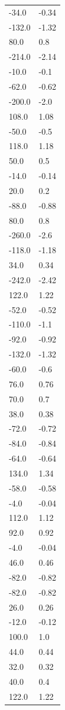 \begin{longtable}{ll}
-34.0 & -0.34 \\
-132.0 & -1.32 \\
80.0 & 0.8 \\
-214.0 & -2.14 \\
-10.0 & -0.1 \\
-62.0 & -0.62 \\
-200.0 & -2.0 \\
108.0 & 1.08 \\
-50.0 & -0.5 \\
118.0 & 1.18 \\
50.0 & 0.5 \\
-14.0 & -0.14 \\
20.0 & 0.2 \\
-88.0 & -0.88 \\
80.0 & 0.8 \\
-260.0 & -2.6 \\
-118.0 & -1.18 \\
34.0 & 0.34 \\
-242.0 & -2.42 \\
122.0 & 1.22 \\
-52.0 & -0.52 \\
-110.0 & -1.1 \\
-92.0 & -0.92 \\
-132.0 & -1.32 \\
-60.0 & -0.6 \\
76.0 & 0.76 \\
70.0 & 0.7 \\
38.0 & 0.38 \\
-72.0 & -0.72 \\
-84.0 & -0.84 \\
-64.0 & -0.64 \\
134.0 & 1.34 \\
-58.0 & -0.58 \\
-4.0 & -0.04 \\
112.0 & 1.12 \\
92.0 & 0.92 \\
-4.0 & -0.04 \\
46.0 & 0.46 \\
-82.0 & -0.82 \\
-82.0 & -0.82 \\
26.0 & 0.26 \\
-12.0 & -0.12 \\
100.0 & 1.0 \\
44.0 & 0.44 \\
32.0 & 0.32 \\
40.0 & 0.4 \\
122.0 & 1.22 \\

\end{longtable}
